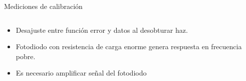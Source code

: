\begin{frame}{Mediciones de calibración}
\begin{onlyenv}
\begin{columns}[c]
            \begin{column}{0.4\textwidth}
                \begin{itemize}
                    \item Desajuste entre función error y datos al desobturar haz.
                    \item Fotodiodo con resistencia de carga enorme genera respuesta en frecuencia pobre.
                    \item Es necesario amplificar señal del fotodiodo
                \end{itemize}
            \end{column}
        \end{columns}
    \end{onlyenv}
\end{frame}
